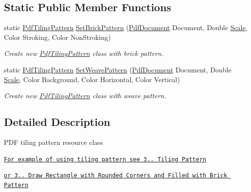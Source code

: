 \subsection*{Static Public Member Functions}
\begin{DoxyCompactItemize}
\item 
static \hyperlink{class_pdf_file_writer_1_1_pdf_tiling_pattern}{Pdf\+Tiling\+Pattern} \hyperlink{class_pdf_file_writer_1_1_pdf_tiling_pattern_ad688d58d0cab7488b9b2218ba9a80bf1}{Set\+Brick\+Pattern} (\hyperlink{class_pdf_file_writer_1_1_pdf_document}{Pdf\+Document} Document, Double \hyperlink{class_pdf_file_writer_1_1_pdf_contents_af2d7cc040971ee1a57c0c5d3fbb888a5}{Scale}, Color Stroking, Color Non\+Stroking)
\begin{DoxyCompactList}\small\item\em Create new \hyperlink{class_pdf_file_writer_1_1_pdf_tiling_pattern}{Pdf\+Tiling\+Pattern} class with brick pattern. \end{DoxyCompactList}\item 
static \hyperlink{class_pdf_file_writer_1_1_pdf_tiling_pattern}{Pdf\+Tiling\+Pattern} \hyperlink{class_pdf_file_writer_1_1_pdf_tiling_pattern_abff51c4ba4e45feab54bc3f32cf7ffdb}{Set\+Weave\+Pattern} (\hyperlink{class_pdf_file_writer_1_1_pdf_document}{Pdf\+Document} Document, Double \hyperlink{class_pdf_file_writer_1_1_pdf_contents_af2d7cc040971ee1a57c0c5d3fbb888a5}{Scale}, Color Background, Color Horizontal, Color Vertical)
\begin{DoxyCompactList}\small\item\em Create new \hyperlink{class_pdf_file_writer_1_1_pdf_tiling_pattern}{Pdf\+Tiling\+Pattern} class with weave pattern. \end{DoxyCompactList}\end{DoxyCompactItemize}


\subsection{Detailed Description}
P\+DF tiling pattern resource class 

\href{http://www.codeproject.com/Articles/570682/PDF-File-Writer-Csharp-Class-Library-Version#TilingPattern}{\tt For example of using tiling pattern see 3.. Tiling Pattern} 

\href{http://www.codeproject.com/Articles/570682/PDF-File-Writer-Csharp-Class-Library-Version#TilingPattern2}{\tt or 3.. Draw Rectangle with Rounded Corners and Filled with Brick Pattern} 

